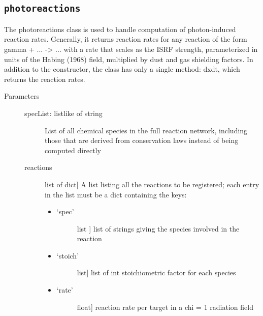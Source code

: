 \documentclass[letterpaper,10pt,english]{sphinxmanual}
\begin{document}
\subsection{\texttt{photoreactions}}
\label{fulldoc:photoreactions}

\begin{fulllineitems}
\label{fulldoc:despotic.chemistry.photoreactions}
The photoreactions class is used to handle computation of
photon-induced reaction rates. Generally, it returns reaction
rates for any reaction of the form
gamma + ... -\textgreater{} ...
with a rate that scales as the ISRF strength, parameterized in
units of the Habing (1968) field, multiplied by dust and gas
shielding factors. In addition to the constructor, the class has
only a single method: dxdt, which returns the reaction rates.
\begin{description}
\item[{Parameters}] \leavevmode\begin{description}
\item[{specList: listlike of string}] \leavevmode
List of all chemical species in the full reaction network,
including those that are derived from conservation laws
instead of being computed directly

\item[{reactions}] \leavevmode{[}list of dict{]}
A list listing all the reactions to be registered; each
entry in the list must be a dict containing the keys:
\begin{itemize}
\item {} \begin{description}
\item[{`spec'}] \leavevmode{[}list {]}
list of strings giving the species involved in the reaction

\end{description}

\item {} \begin{description}
\item[{`stoich'}] \leavevmode{[}list{]}
list of int stoichiometric factor for each species

\end{description}

\item {} \begin{description}
\item[{`rate'}] \leavevmode{[}float{]}
reaction rate per target in a chi = 1 radiation field


\end{description}
\end{itemize}
\end{description}
\end{description}
\end{fulllineitems}
\end{document}
